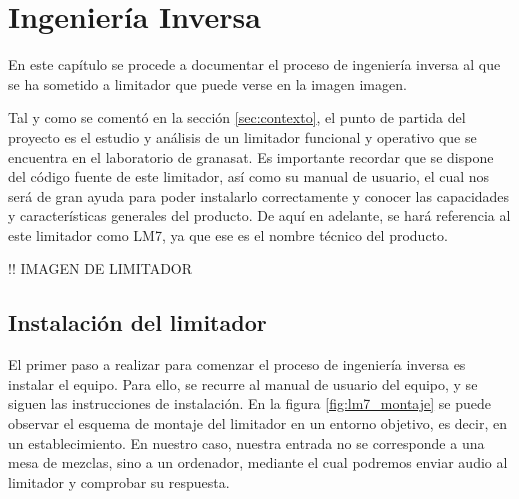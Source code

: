 \chapter{Ingeniería Inversa} \label{cap:capitulo3}

En este capítulo se procede a documentar el proceso de ingeniería inversa al que se ha sometido a limitador que puede verse en la imagen {imagen}.

Tal y como se comentó en la sección \ref{sec:contexto}, el punto de partida del proyecto es el estudio y análisis de un limitador funcional y operativo que se encuentra en el laboratorio de \gls{granasat}. Es importante recordar que se dispone del código fuente de este limitador, así como su manual de usuario, el cual nos será de gran ayuda para poder instalarlo correctamente y conocer las capacidades y características generales del producto. De aquí en adelante, se hará referencia al este limitador como \acrshort{LM7}, ya que ese es el nombre técnico del producto.

!! IMAGEN DE LIMITADOR
\label{img:lms7_cls}

\section{Instalación del limitador}

El primer paso a realizar para comenzar el proceso de ingeniería inversa es instalar el equipo. Para ello, se recurre al manual de usuario del equipo, y se siguen las instrucciones de instalación. En la figura \ref{fig:lm7_montaje} se puede observar el esquema de montaje del limitador en un entorno objetivo, es decir, en un establecimiento. En nuestro caso, nuestra entrada no se corresponde a una mesa de mezclas, sino a un ordenador, mediante el cual podremos enviar audio al limitador y comprobar su respuesta.


